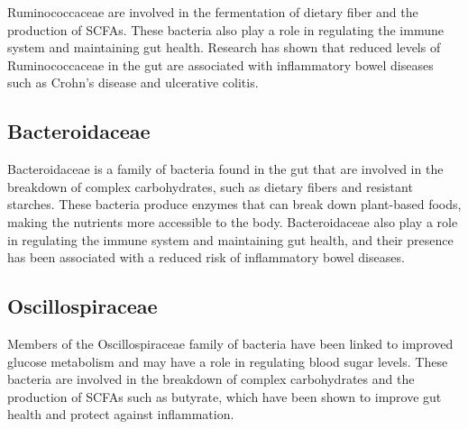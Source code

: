 \documentclass[
]{article}
\begin{document}
\begin{multicols}{2}
\begin{small}
Ruminococcaceae are involved in the fermentation of dietary fiber and the 
production of SCFAs. These bacteria also play a role in regulating the immune 
system and maintaining gut health. Research has shown that reduced levels of 
Ruminococcaceae in the gut are associated with inflammatory bowel diseases such 
as Crohn's disease and ulcerative colitis.
\end{small}

\subsection{Bacteroidaceae}

\begin{small}
Bacteroidaceae is a family of bacteria found in the gut that are involved in the
breakdown of complex carbohydrates, such as dietary fibers and resistant 
starches. These bacteria produce enzymes that can break down plant-based foods, 
making the nutrients more accessible to the body. Bacteroidaceae also play a 
role in regulating the immune system and maintaining gut health, and their 
presence has been associated with a reduced risk of inflammatory bowel diseases.
\end{small}

\subsection{Oscillospiraceae}

\begin{small}
Members of the Oscillospiraceae family of bacteria have been linked to improved 
glucose metabolism and may have a role in regulating blood sugar levels. These 
bacteria are involved in the breakdown of complex carbohydrates and the 
production of SCFAs such as butyrate, which have been shown to improve gut 
health and protect against inflammation.
\end{small}

\end{multicols}
\end{document}
